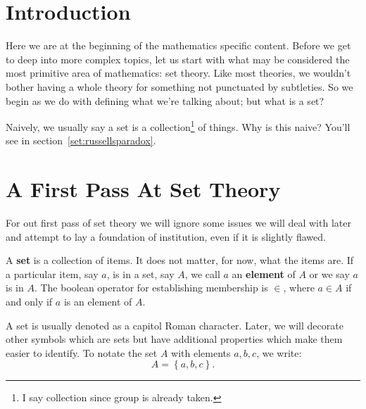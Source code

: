\def\firstcircle{(0,0) circle (3cm)}
\def\secondcircle{(0:4cm) circle (3cm)}



\begin{center}
\end{center}

\section{Introduction}
Here we are at the beginning of the mathematics specific content.
Before we get to deep into more complex topics, let us start with what may be considered the most primitive area of mathematics: set theory.
Like most theories, we wouldn't bother having a whole theory for something not punctuated by subtleties.
So we begin as we do with defining what we're talking about; but what is a set?

Naively, we usually say a set is a collection\footnote{I say collection since group is already taken.} of things.
Why is this naive?
You'll see in section~\ref{set:russellsparadox}.

\section{A First Pass At Set Theory}
For out first pass of set theory we will ignore some issues we will deal with later and attempt to lay a foundation of institution, even if it is slightly flawed.

\begin{defn}
\label{set:NaiveSet:defn}
  A \textbf{set} is a collection of items.
  It does not matter, for now, what the items are.
  If a particular item, say $a$, is in a set, say $A$, we call $a$ an \textbf{element} of $A$ or we say $a$ is in $A$.
  The boolean operator for establishing membership is $\in$, where $a \in A$ if and only if $a$ is an element of $A$.

  A set is usually denoted as a capitol Roman character.
  Later, we will decorate other symbols which are sets but have additional properties which make them easier to identify.
  To notate the set $A$ with elements $a,b,c$, we write:
  $$
    A = \left\{ a, b, c\right\}.
  $$
\end{defn}

